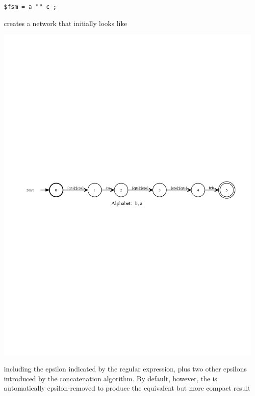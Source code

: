 \begin{Verbatim}
$fsm = a "" c ;
\end{Verbatim}

\noindent
creates a network that initially looks like 

\begin{center}
\includegraphics[width=135mm]{images/aEpsb.pdf}
\end{center}

\noindent
including the epsilon indicated by the regular expression, plus two other epsilons
introduced by the concatenation algorithm.  By default, however, the \fsm{}
is automatically epsilon-removed to produce the equivalent but more compact result

